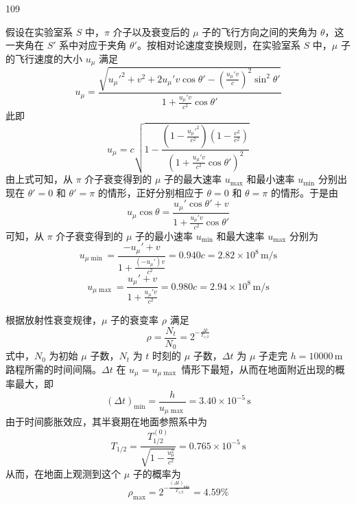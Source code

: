 \begin{solution}{109}
\begin{subsolution}
假设在实验室系 $S$ 中，$\pi$ 介子以及衰变后的 $\mu$ 子的飞行方向之间的夹角为 $\theta$，这一夹角在 $S'$ 系中对应于夹角 $\theta'$。按相对论速度变换规则，在实验室系 $S$ 中，$\mu$ 子的飞行速度的大小 $u_{\mu}$ 满足
\[
u_{\mu} = \frac{\sqrt{u_{\mu}'^{2} + v^{2} + 2 u_{\mu}' v \cos\theta' - \left(\frac{u_{\mu}' v}{c}\right)^{2} \sin^{2}\theta'}}{1 + \frac{u_{\mu}' v}{c^{2}} \cos\theta'}
\]
此即
\[
u_{\mu} = c \sqrt{1 - \frac{\left(1 - \frac{u_{\mu}'^{2}}{c^{2}}\right)\left(1 - \frac{v^{2}}{c^{2}}\right)}{\left(1 + \frac{u_{\mu}' v}{c^{2}} \cos\theta'\right)^{2}}}
\]
由上式可知，从 $\pi$ 介子衰变得到的 $\mu$ 子的最大速率 $u_{\max}$ 和最小速率 $u_{\min}$ 分别出现在 $\theta' = 0$ 和 $\theta' = \pi$ 的情形，正好分别相应于 $\theta = 0$ 和 $\theta = \pi$ 的情形。于是由
\[
u_{\mu} \cos\theta = \frac{u_{\mu}' \cos\theta' + v}{1 + \frac{u_{\mu}' v}{c^{2}} \cos\theta'}
\]
可知，从 $\pi$ 介子衰变得到的 $\mu$ 子的最小速率 $u_{\min}$ 和最大速率 $u_{\max}$ 分别为
\begin{equation}
u_{\mu\min} = \frac{-u_{\mu}' + v}{1 + \frac{(-u_{\mu}') v}{c^{2}}} = 0.940c = 2.82 \times 10^{8}\,\mathrm{m/s}
\label{eq:6.s109}
\end{equation}
\begin{equation}
u_{\mu\max} = \frac{u_{\mu}' + v}{1 + \frac{u_{\mu}' v}{c^{2}}} = 0.980c = 2.94 \times 10^{8}\,\mathrm{m/s}
\label{eq:7.s109}
\end{equation}
\end{subsolution}

\begin{subsolution}
根据放射性衰变规律，$\mu$ 子的衰变率 $\rho$ 满足
\begin{equation}
\rho = \frac{N_{t}}{N_{0}} = 2^{- \frac{\Delta t}{T_{1/2}}}
\label{eq:8.s109}
\end{equation}
式中，$N_{0}$ 为初始 $\mu$ 子数，$N_{t}$ 为 $t$ 时刻的 $\mu$ 子数，$\Delta t$ 为 $\mu$ 子走完 $h = 10000\,\mathrm{m}$ 路程所需的时间间隔。$\Delta t$ 在 $u_{\mu} = u_{\mu\max}$ 情形下最短，从而在地面附近出现的概率最大，即
\begin{equation}
(\Delta t)_{\min} = \frac{h}{u_{\mu\max}} = 3.40 \times 10^{-5}\,\mathrm{s}
\label{eq:9.s109}
\end{equation}
由于时间膨胀效应，其半衰期在地面参照系中为
\begin{equation}
T_{1/2} = \frac{T_{1/2}^{(0)}}{\sqrt{1 - \frac{u_{\mu}^{2}}{c^{2}}}} = 0.765 \times 10^{-5}\,\mathrm{s}
\label{eq:10.s109}
\end{equation}
从而，在地面上观测到这个 $\mu$ 子的概率为
\begin{equation}
\rho_{\max} = 2^{- \frac{(\Delta t)_{\min}}{T_{1/2}}} = 4.59\%
\label{eq:11.s109}
\end{equation}


\end{subsolution}
\end{solution}
